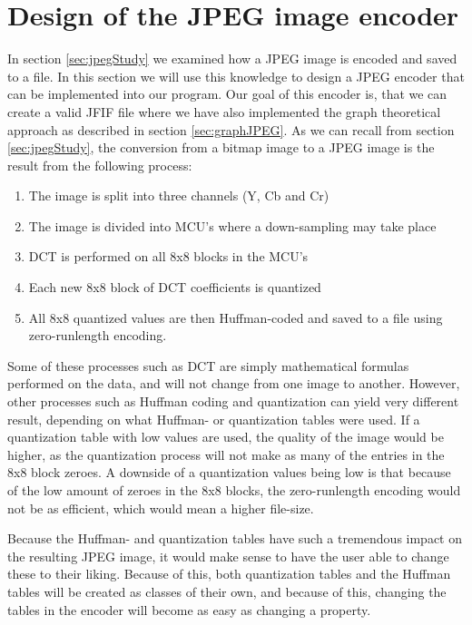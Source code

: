 \section{Design of the JPEG image encoder}
In section \ref{sec:jpegStudy} we examined how a JPEG image is encoded and saved to a file.
In this section we will use this knowledge to design a JPEG encoder that can be implemented into our program.
Our goal of this encoder is, that we can create a valid JFIF file where we have also implemented the graph theoretical approach as described in section \ref{sec:graphJPEG}.
As we can recall from section \ref{sec:jpegStudy}, the conversion from a bitmap image to a JPEG image is the result from the following process:

\begin{enumerate}
	\item The image is split into three channels (Y, Cb and Cr)
	\item The image is divided into MCU's where a down-sampling may take place
	\item DCT is performed on all 8x8 blocks in the MCU's
	\item Each new 8x8 block of DCT coefficients is quantized
	\item All 8x8 quantized values are then Huffman-coded and saved to a file using zero-runlength encoding.
\end{enumerate}

Some of these processes such as DCT are simply mathematical formulas performed on the data, and will not change from one image to another. However, other processes such as Huffman coding and quantization can yield very different result, depending on what Huffman- or quantization tables were used. 
If a quantization table with low values are used, the quality of the image would be higher, as the quantization process will not make as many of the entries in the 8x8 block zeroes. 
A downside of a quantization values being low is that because of the low amount of zeroes in the 8x8 blocks, the zero-runlength encoding would not be as efficient, which would mean a higher file-size. 

Because the Huffman- and quantization tables have such a tremendous impact on the resulting JPEG image, it would make sense to have the user able to change these to their liking. 
Because of this, both quantization tables and the Huffman tables will be created as classes of their own, and because of this, changing the tables in the encoder will become as easy as changing a property.

